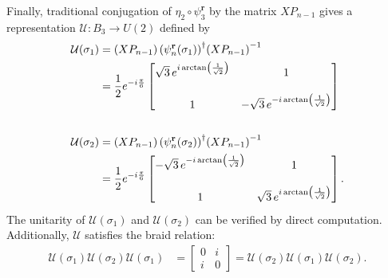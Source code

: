 \begin{example}
    Finally, traditional conjugation of $\eta_2\circ\psi_3^\textbf{r}$ by the matrix $XP_{n-1}$ gives a representation $\mathcal{U}:B_3\to U(2)$ defined by
    \begin{align*}
        \mathcal{U}(\sigma_1) &= \left( X P_{n-1} \right){\left( \psi_n^\mathbf{r} (\sigma_1)\right)}^\dagger{ \left( X P_{n-1} \right) }^{-1} \\
        &= \frac{1}{2}e^{-i\frac{\pi}{6}}\begin{bmatrix}
            \sqrt{3}\,e^{i\arctan\left( \frac{1}{\sqrt{2}} \right)} & 1 \\
            \\
            1 & -\sqrt{3}\,e^{-i\arctan\left( \frac{1}{\sqrt{2}} \right)}
        \end{bmatrix} \\ 
        \\
        \mathcal{U}(\sigma_2) &= \left( X P_{n-1} \right){\left( \psi_n^\mathbf{r} (\sigma_2)\right)}^\dagger{ \left( X P_{n-1} \right) }^{-1} \\
        &= \frac{1}{2}e^{-i\frac{\pi}{6}}\begin{bmatrix}
            -\sqrt{3}\,e^{-i\arctan\left( \frac{1}{\sqrt{2}} \right)} & 1 \\
            \\
            1 & \sqrt{3}\,e^{i\arctan\left( \frac{1}{\sqrt{2}} \right)}
        \end{bmatrix}.
    \end{align*}
    The unitarity of $\mathcal{U}(\sigma_1)$ and $\mathcal{U}(\sigma_2)$ can be verified by direct computation. Additionally, $\mathcal{U}$ satisfies the braid relation:
    \begin{align*}
        \mathcal{U}(\sigma_1)\mathcal{U}(\sigma_2)\mathcal{U}(\sigma_1) &= \begin{bmatrix}
            0 & i \\
            i & 0
        \end{bmatrix} = \mathcal{U}(\sigma_2)\mathcal{U}(\sigma_1)\mathcal{U}(\sigma_2).
    \end{align*}
\end{example}